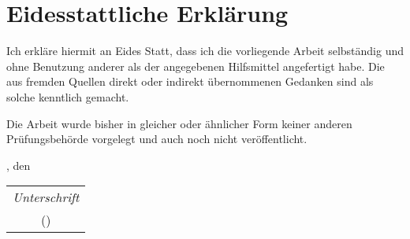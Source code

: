 \chapter*{Eidesstattliche Erklärung}
	Ich erkläre hiermit an Eides Statt, dass ich die vorliegende Arbeit selbständig und ohne Benutzung anderer als der angegebenen Hilfsmittel angefertigt habe. Die aus fremden Quellen direkt oder indirekt übernommenen Gedanken sind als solche kenntlich gemacht.
	
	Die Arbeit wurde bisher in gleicher oder ähnlicher Form keiner anderen Prüfungsbehörde vorgelegt und auch noch nicht veröffentlicht.
	
	\VarOrt, den \VarDatum \\
	\vspace{1cm}
	\begin{flushright}
		\begin{tabular}{@{}c@{}} %
			\emph{Unterschrift}\\
			(\VarAuthor)
		\end{tabular}
	\end{flushright}